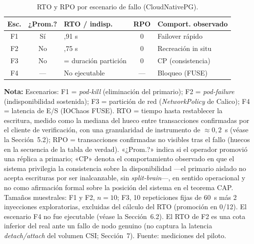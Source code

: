 \documentclass[12pt,twocolumn,letterpaper]{article}
\newcommand{\fignota}[1]{\par\vspace{2pt}\begingroup\footnotesize\justifying
  \textbf{Nota:} #1\par\endgroup}
\begin{document}
\begin{table}[!tb]
\centering
\footnotesize
\renewcommand{\arraystretch}{1.2}
\begin{tabularx}{\linewidth}{@{}c c >{\raggedright\arraybackslash}X c >{\raggedright\arraybackslash}p{1.9cm}@{}}
\toprule
\textbf{Esc.} & \textbf{¿Prom.?} & \textbf{RTO / indisp.} & \textbf{RPO} & \textbf{Comport. observado} \\
\midrule
F1 & Sí & 7,91 s & 0 & Failover rápido \\
F2 & No & 36,75 s & 0 & Recreación in situ \\
F3 & No & = duración partición & 0 & CP (consistencia) \\
F4 & --- & No ejecutable & --- & Bloqueo (FUSE) \\
\bottomrule
\end{tabularx}
\caption{RTO y RPO por escenario de fallo (CloudNativePG).}
\label{tab:rto}
\fignota{Escenarios: F1 = \textit{pod-kill} (eliminación del primario); F2 = \textit{pod-failure} (indisponibilidad sostenida); F3 = partición de red (\textit{NetworkPolicy} de Calico); F4 = latencia de E/S (IOChaos FUSE). RTO = tiempo hasta restablecer la escritura, medido como la mediana del hueco entre transacciones confirmadas por el cliente de verificación, con una granularidad de instrumento de $\approx 0{,}2$~s (véase la Sección~5.2); RPO = transacciones confirmadas no visibles tras el fallo (huecos en la secuencia de la tabla de verdad). «¿Prom.?» indica si el operador promovió una réplica a primario; «CP» denota el comportamiento observado en que el sistema privilegia la consistencia sobre la disponibilidad —el primario aislado no acepta escrituras por ser inalcanzable, sin \textit{split-brain}—, en sentido operacional y no como afirmación formal sobre la posición del sistema en el teorema CAP. Tamaños muestrales: F1 y F2, $n=10$; F3, 10 repeticiones fijas de 60~s más 2 inyecciones exploratorias, excluidas del cálculo del RTO (promoción en 0/12). El escenario F4 no fue ejecutable (véase la Sección~6.2). El RTO de F2 es una cota inferior del real ante un fallo de nodo genuino (no captura la latencia \textit{detach/attach} del volumen CSI; Sección~7). Fuente: mediciones del piloto.}
\end{table}
\end{document}

